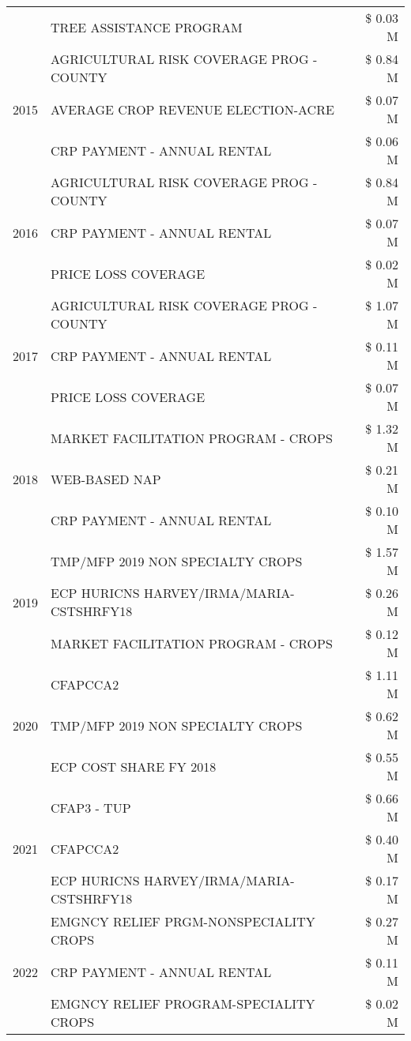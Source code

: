\begin{tabular}{llr}
 & TREE ASSISTANCE PROGRAM & \$ 0.03 M \\
\cline{1-3}
\multirow[t]{3}{*}{2015} & AGRICULTURAL RISK COVERAGE PROG - COUNTY & \$ 0.84 M \\
 & AVERAGE CROP REVENUE ELECTION-ACRE & \$ 0.07 M \\
 & CRP PAYMENT - ANNUAL RENTAL & \$ 0.06 M \\
\cline{1-3}
\multirow[t]{3}{*}{2016} & AGRICULTURAL RISK COVERAGE PROG - COUNTY & \$ 0.84 M \\
 & CRP PAYMENT - ANNUAL RENTAL & \$ 0.07 M \\
 & PRICE LOSS COVERAGE & \$ 0.02 M \\
\cline{1-3}
\multirow[t]{3}{*}{2017} & AGRICULTURAL RISK COVERAGE PROG - COUNTY & \$ 1.07 M \\
 & CRP PAYMENT - ANNUAL RENTAL & \$ 0.11 M \\
 & PRICE LOSS COVERAGE & \$ 0.07 M \\
\cline{1-3}
\multirow[t]{3}{*}{2018} & MARKET FACILITATION PROGRAM - CROPS & \$ 1.32 M \\
 & WEB-BASED NAP & \$ 0.21 M \\
 & CRP PAYMENT - ANNUAL RENTAL & \$ 0.10 M \\
\cline{1-3}
\multirow[t]{3}{*}{2019} & TMP/MFP 2019 NON SPECIALTY CROPS & \$ 1.57 M \\
 & ECP HURICNS HARVEY/IRMA/MARIA-CSTSHRFY18 & \$ 0.26 M \\
 & MARKET FACILITATION PROGRAM - CROPS & \$ 0.12 M \\
\cline{1-3}
\multirow[t]{3}{*}{2020} & CFAPCCA2 & \$ 1.11 M \\
 & TMP/MFP 2019 NON SPECIALTY CROPS & \$ 0.62 M \\
 & ECP COST SHARE FY 2018 & \$ 0.55 M \\
\cline{1-3}
\multirow[t]{3}{*}{2021} & CFAP3 - TUP & \$ 0.66 M \\
 & CFAPCCA2 & \$ 0.40 M \\
 & ECP HURICNS HARVEY/IRMA/MARIA-CSTSHRFY18 & \$ 0.17 M \\
\cline{1-3}
\multirow[t]{3}{*}{2022} & EMGNCY RELIEF PRGM-NONSPECIALITY CROPS & \$ 0.27 M \\
 & CRP PAYMENT - ANNUAL RENTAL & \$ 0.11 M \\
 & EMGNCY RELIEF PROGRAM-SPECIALITY CROPS & \$ 0.02 M \\
\cline{1-3}
\bottomrule
\end{tabular}
